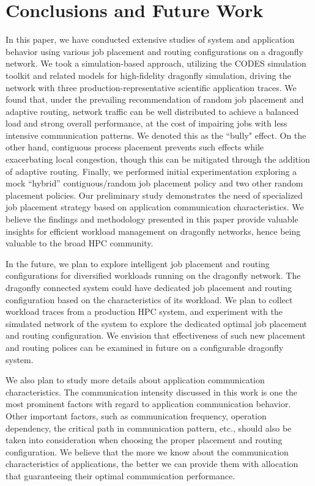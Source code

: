 \section{Conclusions and Future Work}
\label{sec:conclusion}

In this paper, we have conducted extensive studies of system and application behavior using various job placement and routing configurations on a dragonfly network. We took a simulation-based approach, utilizing the CODES simulation toolkit and related models for high-fidelity dragonfly simulation, driving the network with three production-representative scientific application traces. We found that, under the prevailing recommendation of random job placement and adaptive routing, 
network traffic can be well distributed to achieve a balanced load and strong overall performance, 
at the cost of impairing jobs with less intensive communication patterns. We denoted this as the ``bully" effect. On the other hand, contiguous process placement prevents such effects while exacerbating local congestion, though this can be mitigated through the addition of adaptive routing. 
Finally, we performed initial experimentation exploring a mock ``hybrid'' contiguous/random job placement policy and two other random placement policies. 
Our preliminary study demonstrates the need of specialized job placement strategy based on application communication characteristics. 
We believe the findings and methodology presented in this paper provide valuable insights for efficient workload management on dragonfly networks, hence being valuable to the broad HPC community.


In the future, we plan to explore intelligent job placement and routing configurations for diversified workloads running on the dragonfly network. The dragonfly connected system could have dedicated job placement and routing configuration based on the characteristics of its workload. We plan to collect workload traces from a production HPC system, and experiment with the simulated network of the system to explore the dedicated optimal job placement and routing configuration. We envision that effectiveness of such new placement and routing polices can be examined in future on a configurable dragonfly system. 

We also plan to study more details about application communication characteristics. The communication intensity discussed in this work is one the most prominent factors with regard to application communication behavior. Other important factors, such as communication frequency, operation dependency, the critical path in communication pattern, etc., should also be taken into consideration when choosing the proper placement and routing configuration. We believe that the more we know about the communication characteristics of applications, the better we can provide them with allocation that guaranteeing their optimal communication performance.









